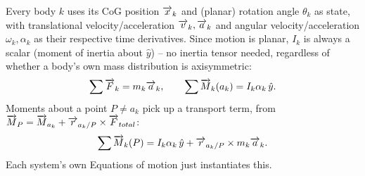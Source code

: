 \label{sec:rigidbody}
Every body $k$ uses its CoG position $\overrightarrow{x}_k$ and (planar) rotation angle $\theta_k$ as state, with translational velocity/acceleration $\overrightarrow{v}_k,\overrightarrow{a}_k$ and angular velocity/acceleration $\omega_k,\alpha_k$ as their respective time derivatives. Since motion is planar, $I_k$ is always a scalar (moment of inertia about $\hat y$) -- no inertia tensor needed, regardless of whether a body's own mass distribution is axisymmetric:
\begin{equation}
    \sum\overrightarrow{F}_k = m_k\overrightarrow{a}_k, \qquad \sum\overrightarrow{M}_k(a_k) = I_k\alpha_k\,\hat y.
\end{equation}
Moments about a point $P\ne a_k$ pick up a transport term, from $\overrightarrow{M}_P=\overrightarrow{M}_{a_k}+\overrightarrow{r}_{a_k/P}\times\overrightarrow{F}_{total}$:
\begin{equation}
    \sum\overrightarrow{M}_k(P) = I_k\alpha_k\,\hat y + \overrightarrow{r}_{a_k/P}\times m_k\overrightarrow{a}_k.
\end{equation}
Each system's own Equations of motion just instantiates this.
